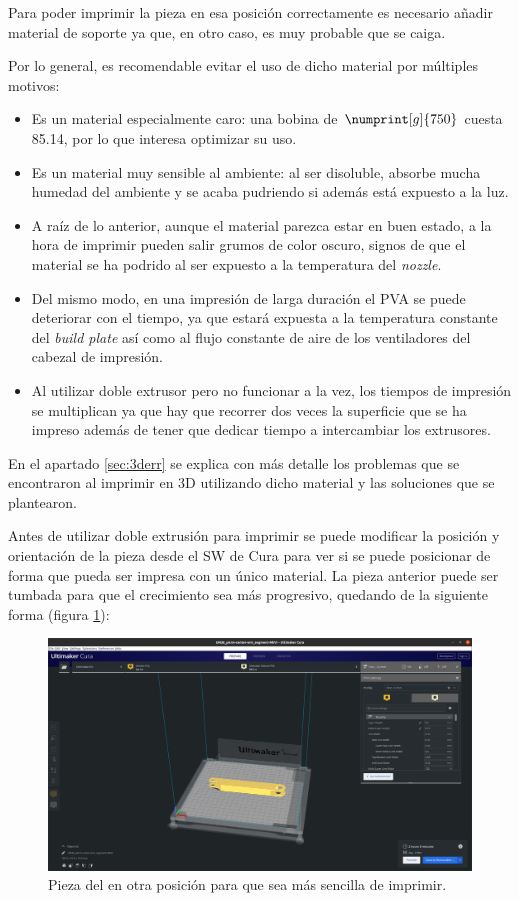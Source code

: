 Para poder imprimir la pieza en esa posición correctamente es necesario añadir material
de soporte ya que, en otro caso, es muy probable que se caiga.

Por lo general, es recomendable evitar el uso de dicho material por múltiples motivos:

\begin{itemize}
    \item Es un material especialmente caro: una bobina de $\numprint[g]{750}$ cuesta
    85.14\EUR{}, por lo que interesa optimizar su uso.

    \item Es un material muy sensible al ambiente: al ser disoluble, absorbe mucha
    humedad del ambiente y se acaba pudriendo si además está expuesto a la luz.

    \item A raíz de lo anterior, aunque el material parezca estar en buen estado, a
    la hora de imprimir pueden salir grumos de color oscuro, signos de que el material
    se ha podrido al ser expuesto a la temperatura del \textit{nozzle}.

    \item Del mismo modo, en una impresión de larga duración el \ac{PVA} se puede
    deteriorar con el tiempo, ya que estará expuesta a la temperatura constante del
    \textit{build plate} así como al flujo constante de aire de los ventiladores del
    cabezal de impresión.

    \item Al utilizar doble extrusor pero no funcionar a la vez, los tiempos de 
    impresión se multiplican ya que hay que recorrer dos veces la superficie que se
    ha impreso además de tener que dedicar tiempo a intercambiar los extrusores.
\end{itemize}

En el apartado \ref{sec:3derr} se explica con más detalle los problemas que se
encontraron al imprimir en 3D utilizando dicho material y las soluciones que se
plantearon.

Antes de utilizar doble extrusión para imprimir se puede modificar la posición
y orientación de la pieza desde el \ac{SW} de Cura para ver si se puede posicionar
de forma que pueda ser impresa con un único material. La pieza anterior puede ser
tumbada para que el crecimiento sea más progresivo, quedando de la siguiente forma
(figura \ref{fig:vpiece_2}):

\begin{figure}[H]
    \centering
    \includegraphics[width=.7\linewidth]{pictures/v_piece_2.png}
    \caption{Pieza del \pArm{} en otra posición para que sea más sencilla de imprimir.}
    \label{fig:vpiece_2}
\end{figure}

